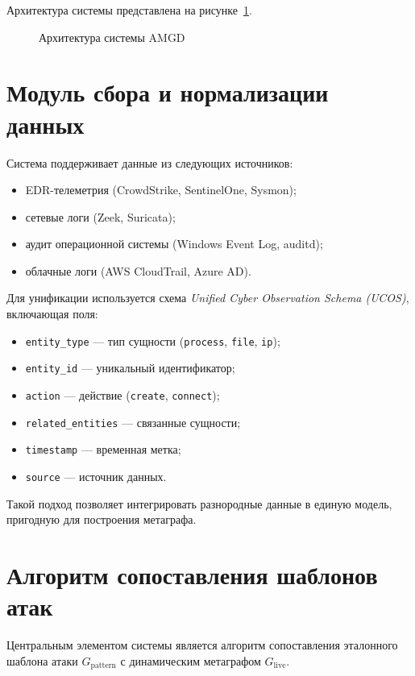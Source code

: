 \documentclass{article}
\begin{document}
Архитектура системы представлена на рисунке~\ref{fig:amgd_arch}.

\begin{figure}[ht]
    \centering
        
    \caption{Архитектура системы AMGD}
    \label{fig:amgd_arch}
\end{figure}

\section{Модуль сбора и нормализации данных}\label{sec:ch3/sect2}

Система поддерживает данные из следующих источников:

\noindent
\begin{itemize}
    \item EDR-телеметрия (CrowdStrike, SentinelOne, Sysmon);
    \item сетевые логи (Zeek, Suricata);
    \item аудит операционной системы (Windows Event Log, auditd);
    \item облачные логи (AWS CloudTrail, Azure AD).
\end{itemize}

Для унификации используется схема \textit{Unified Cyber Observation Schema (UCOS)}, включающая поля:

\noindent
\begin{itemize}
    \item \texttt{entity\_type} — тип сущности (\texttt{process}, \texttt{file}, \texttt{ip});
    \item \texttt{entity\_id} — уникальный идентификатор;
    \item \texttt{action} — действие (\texttt{create}, \texttt{connect});
    \item \texttt{related\_entities} — связанные сущности;
    \item \texttt{timestamp} — временная метка;
    \item \texttt{source} — источник данных.
\end{itemize}
Такой подход позволяет интегрировать разнородные данные в единую модель, пригодную для построения метаграфа.

\section{Алгоритм сопоставления шаблонов атак}\label{sec:ch3/sect3}

Центральным элементом системы является алгоритм сопоставления эталонного шаблона атаки $G_{\text{pattern}}$ с динамическим метаграфом $G_{\text{live}}$.
\end{document}
